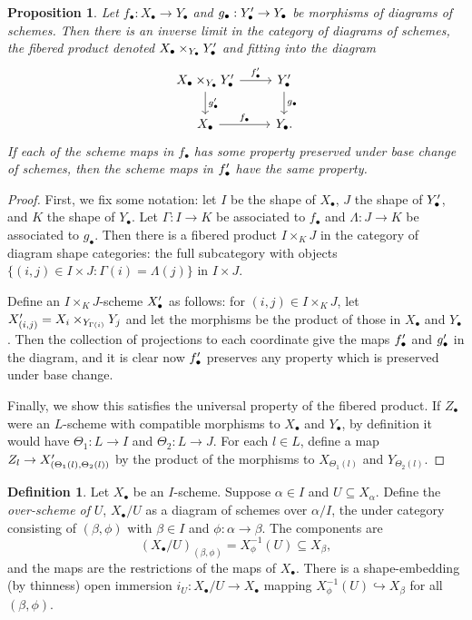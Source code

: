 \documentclass[proquest]{uwthesis}[2014/11/13]
\newtheorem{prop}[theorem]{Proposition}
\theoremstyle{definition}
\newtheorem{definition}[theorem]{Definition}
\begin{document}
\begin{prop}
	\label{thm:fiberedprod}
	Let $f_\bullet : X_\bullet \rightarrow Y_\bullet$ and $g_\bullet : Y_\bullet\rq{} \rightarrow Y_\bullet$ be morphisms of diagrams of schemes.
	Then there is an inverse limit in the category of diagrams of schemes, the fibered product denoted $X_\bullet \times_{Y_\bullet} Y_\bullet\rq{}$ and fitting into the diagram
	\[
	\begin{tikzcd}
	X_\bullet \times_{Y_\bullet} Y_\bullet\rq{} \arrow{r}{f_\bullet\rq{}} \arrow{d}{g_\bullet\rq{}} & Y_\bullet\rq{} \arrow{d}{g_\bullet} \\
	X_\bullet \arrow{r}{f_\bullet} & Y_\bullet.
	\end{tikzcd}
	\]
	If each of the scheme maps in $f_\bullet$ has some property preserved under base change of schemes, then the scheme maps in $f_\bullet\rq{}$ have the same property.
\end{prop}
\begin{proof}
	First, we fix some notation: let $I$ be the shape of $X_\bullet$, $J$ the shape of $Y_\bullet\rq{}$, and $K$ the shape of $Y_\bullet$.
	Let $\Gamma : I \rightarrow K$ be associated to $f_\bullet$ and $\Lambda : J \rightarrow K$ be associated to $g_\bullet$.
	Then there is a fibered product $I \times_K J$ in the category of diagram shape categories: the full subcategory with objects $\{(i, j) \in I \times J : \Gamma(i) = \Lambda(j) \}$ in $I \times J$.
	
	Define an $I \times_K J$-scheme $X_\bullet\rq{}$ as follows: for $(i, j) \in I \times_K J$, let $X_{(i,j)}\rq{} = X_i \times_{Y_{\Gamma(i)}} Y_j$ and let the morphisms be the product of those in $X_\bullet$ and $Y_\bullet$.
	Then the collection of projections to each coordinate give the maps $f_\bullet\rq{}$ and $g_\bullet\rq{}$ in the diagram, and it is clear now $f_\bullet\rq{}$ preserves any property which is preserved under base change.
	
	Finally, we show this satisfies the universal property of the fibered product.
	If $Z_\bullet$ were an $L$-scheme with compatible morphisms to $X_\bullet$ and $Y_\bullet$, by definition it would have $\Theta_1 : L \rightarrow I$ and $\Theta_2 : L \rightarrow J$.
	For each $l \in L$, define a map $Z_l \rightarrow X_{(\Theta_1(l), \Theta_2(l))}\rq{}$ by the product of the morphisms to $X_{\Theta_1(l)}$ and $Y_{\Theta_2(l)}$.
\end{proof}

\begin{definition}
	\label{def:overscheme}
	Let $X_\bullet$ be an $I$-scheme.
	Suppose $\alpha \in I$ and $U \subseteq X_\alpha$.
	Define the {\it over-scheme of} $U$, $X_\bullet/U$ as a diagram of schemes over $\alpha/I$, the under category consisting of $(\beta, \phi)$ with $\beta \in I$ and $\phi : \alpha \rightarrow \beta$.
	The components are
	\[
	(X_\bullet/U)_{(\beta, \phi)} = X_\phi^{-1} (U) \subseteq X_\beta,
	\]
	and the maps are the restrictions of the maps of $X_\bullet$.
	There is a shape-embedding (by thinness) open immersion $i_U : X_\bullet / U \rightarrow X_\bullet$ mapping $X_\phi^{-1}(U) \hookrightarrow X_\beta$ for all $(\beta, \phi)$.
\end{definition}
\end{document}
